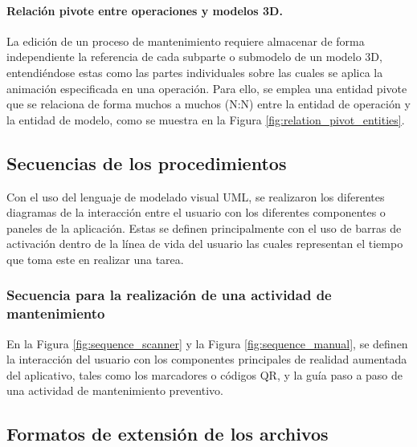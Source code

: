             

            \paragraph{Relación pivote entre operaciones y modelos 3D.} La edición de un proceso de mantenimiento requiere almacenar de forma independiente la referencia de cada subparte o submodelo de un modelo 3D, entendiéndose estas como las partes individuales sobre las cuales se aplica la animación especificada en una operación. Para ello, se emplea una entidad pivote que se relaciona de forma muchos a muchos (N:N) entre la entidad de operación y la entidad de modelo, como se muestra en la Figura \ref{fig:relation_pivot_entities}.

            

    \subsection{Secuencias de los procedimientos}

        Con el uso del lenguaje de modelado visual UML, se realizaron los diferentes diagramas de la interacción entre el usuario con los diferentes componentes o paneles de la aplicación. Estas se definen principalmente con el uso de barras de activación dentro de la línea de vida del usuario las cuales representan el tiempo que toma este en realizar una tarea.

        \subsubsection{Secuencia para la realización de una actividad de mantenimiento}

            En la Figura \ref{fig:sequence_scanner} y la Figura \ref{fig:sequence_manual}, se definen la interacción del usuario con los componentes principales de realidad aumentada del aplicativo, tales como los marcadores o códigos QR, y la guía paso a paso de una actividad de mantenimiento preventivo.

            

            

    \subsection{Formatos de extensión de los archivos}


